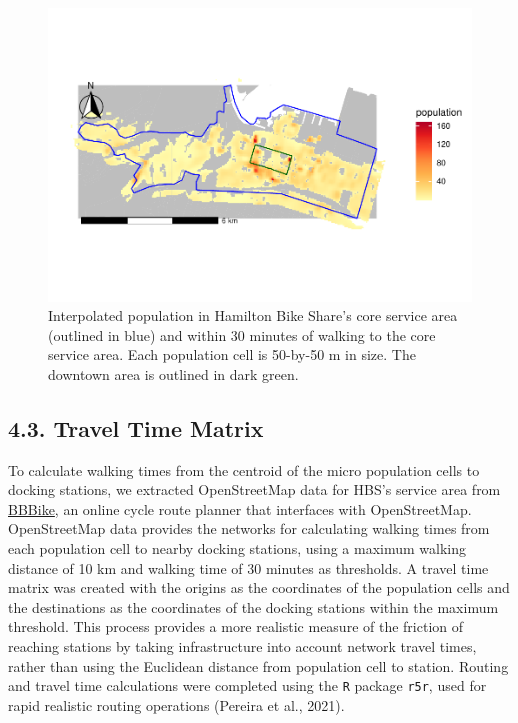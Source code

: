\documentclass[]{elsarticle} %
\begin{document}
\begin{figure}

{\centering \includegraphics[width=0.9\linewidth]{Bike-share-spatial-equity_files/figure-latex/interpolated-population-1} 

}

\caption{Interpolated population in Hamilton Bike Share's core service area (outlined in blue) and within 30 minutes of walking to the core service area. Each population cell is 50-by-50 m in size. The downtown area is outlined in dark green.}\label{fig:interpolated-population}
\end{figure}

\hypertarget{travel-time-matrix}{%
\subsection{4.3. Travel Time Matrix}\label{travel-time-matrix}}

To calculate walking times from the centroid of the micro population
cells to docking stations, we extracted OpenStreetMap data for HBS's
service area from
\href{https://download.bbbike.org/osm/bbbike/}{BBBike}, an online cycle
route planner that interfaces with OpenStreetMap. OpenStreetMap data
provides the networks for calculating walking times from each population
cell to nearby docking stations, using a maximum walking distance of 10
km and walking time of 30 minutes as thresholds. A travel time matrix
was created with the origins as the coordinates of the population cells
and the destinations as the coordinates of the docking stations within
the maximum threshold. This process provides a more realistic measure of
the friction of reaching stations by taking infrastructure into account
network travel times, rather than using the Euclidean distance from
population cell to station. Routing and travel time calculations were
completed using the \texttt{R} package \texttt{r5r}, used for rapid
realistic routing operations (Pereira et al., 2021).
\end{document}
